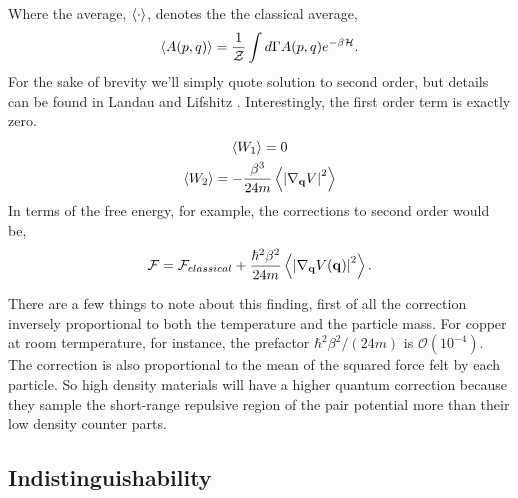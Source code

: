 %
Where the average, $\left\langle \cdot \right\rangle$, denotes the the classical average, 
%
\begin{equation}
    \langle A(p, q) \rangle = \frac{1}{\mathcal{Z}} 
        \int d\Gamma A(p, q) e^{-\beta \mathcal{H}}.
\end{equation}
%
For the sake of brevity we'll simply quote solution to second order, but details can be found in Landau and Lifshitz \cite{LANDAU198079}.
Interestingly, the first order term is exactly zero.
%
\begin{gather}
    \left\langle W_1 \right\rangle= 0 \\
    \left\langle W_2 \right\rangle = - \frac{\beta^3}{24 m} \left\langle \left\vert \nabla_{\mathbf{q}} V \right\vert^2 \right\rangle 
\end{gather}
%
In terms of the free energy, for example, the corrections to second order would be, 
%
\begin{equation}{\label{quantumcorr}}
    \mathcal{F} = \mathcal{F}_{classical} + \frac{\hbar^2\beta^2}{24m}
        \left\langle  \left\vert \nabla_{\mathbf{q}} V(\mathbf{q}) \right\vert^2  \right\rangle.
\end{equation}

There are a few things to note about this finding, first of all the correction inversely proportional to both the temperature and the particle mass.
For copper at room termperature, for instance, the prefactor $\hbar^2\beta^2/(24 m)$ is $\mathcal{O}(10^{-4})$. 
The correction is also proportional to the mean of the squared force felt by each particle. So high density materials will have a higher quantum correction because they sample the short-range repulsive region of the pair potential more than their low density counter parts.


\subsection{Indistinguishability} %

